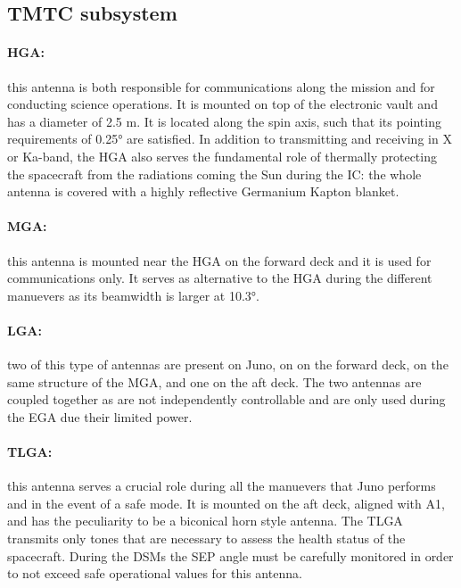\subsection{TMTC subsystem}
\label{subsec:tmtc_sub}

\paragraph{HGA:}this antenna is both responsible for communications along the mission and for conducting science operations. It is mounted on top of the electronic vault and has a diameter of 2.5 m. It is located along the spin axis, such that its pointing requirements of 0.25° are satisfied. In addition to transmitting and receiving in X or Ka-band, the HGA also serves the fundamental role of thermally protecting the spacecraft from the radiations coming the Sun during the IC: the whole antenna is covered with a highly reflective Germanium Kapton blanket. 

\vspace{-4mm}

\paragraph{MGA:}this antenna is mounted near the HGA on the forward deck and it is used for communications only. It serves as alternative to the HGA during the different manuevers as its beamwidth is larger at 10.3°. 

\vspace{-4mm}

\paragraph{LGA:}two of this type of antennas are present on Juno, on on the forward deck, on the same structure of the MGA, and one on the aft deck. The two antennas are coupled together as are not independently controllable and are only used during the EGA due their limited power. 

\vspace{-4mm}

\paragraph{TLGA:}this antenna serves a crucial role during all the manuevers that Juno performs and in the event of a safe mode. It is mounted on the aft deck, aligned with A1, and has the peculiarity to be a biconical horn style antenna. The TLGA transmits only tones that are necessary to assess the health status of the spacecraft. During the DSMs the SEP angle must be carefully monitored in order to not exceed safe operational values for this antenna. 

